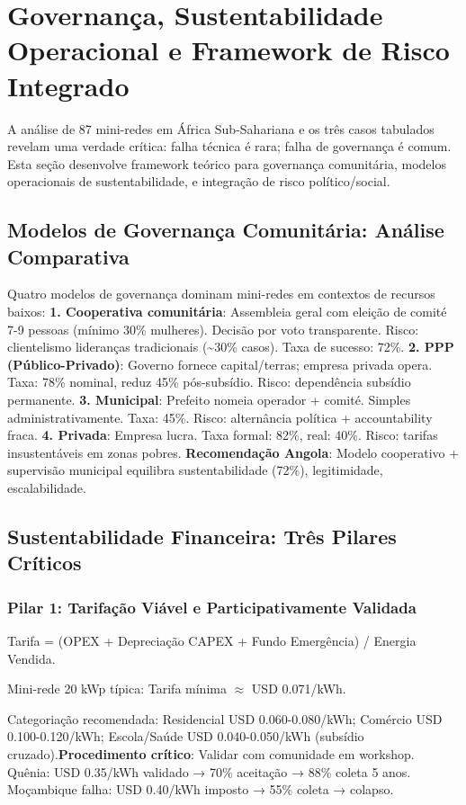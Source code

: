 \documentclass[12pt, a4paper]{article}
\begin{document}
\section{Governança, Sustentabilidade Operacional e Framework de Risco Integrado}

A análise de 87 mini-redes em África Sub-Sahariana e os três casos tabulados revelam uma verdade crítica: falha técnica é rara; falha de governança é comum. Esta seção desenvolve framework teórico para governança comunitária, modelos operacionais de sustentabilidade, e integração de risco político/social.

\subsection{Modelos de Governança Comunitária: Análise Comparativa}

Quatro modelos de governança dominam mini-redes em contextos de recursos baixos:
\textbf{1. Cooperativa comunitária}: Assembleia geral com eleição de comité 7-9 pessoas (mínimo 30\% mulheres). Decisão por voto transparente. Risco: clientelismo lideranças tradicionais (\textasciitilde{}30\% casos). Taxa de sucesso: 72\%.
\textbf{2. PPP (Público-Privado)}: Governo fornece capital/terras; empresa privada opera. Taxa: 78\% nominal, reduz 45\% pós-subsídio. Risco: dependência subsídio permanente.
\textbf{3. Municipal}: Prefeito nomeia operador + comité. Simples administrativamente. Taxa: 45\%. Risco: alternância política + accountability fraca.
\textbf{4. Privada}: Empresa lucra. Taxa formal: 82\%, real: 40\%. Risco: tarifas insustentáveis em zonas pobres.
\textbf{Recomendação Angola}: Modelo cooperativo + supervisão municipal equilibra sustentabilidade (72\%), legitimidade, escalabilidade.

\subsection{Sustentabilidade Financeira: Três Pilares Críticos}

\subsubsection{Pilar 1: Tarifação Viável e Participativamente Validada}

Tarifa = (OPEX + Depreciação CAPEX + Fundo Emergência) / Energia Vendida.

Mini-rede 20 kWp típica: Tarifa mínima $\approx$ USD 0.071/kWh.

Categoriação recomendada: Residencial USD 0.060-0.080/kWh; Comércio USD 0.100-0.120/kWh; Escola/Saúde USD 0.040-0.050/kWh (subsídio cruzado).\textbf{Procedimento crítico}: Validar com comunidade em workshop. Quênia: USD 0.35/kWh validado → 70\% aceitação → 88\% coleta 5 anos. Moçambique falha: USD 0.40/kWh imposto → 55\% coleta → colapso.
\end{document}
